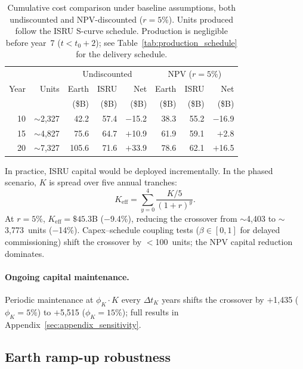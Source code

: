 \documentclass[preprint,12pt]{elsarticle}
\begin{document}
\begin{table}[htbp]
\centering
\caption{Cumulative cost comparison under baseline assumptions, both undiscounted and NPV-discounted ($r = 5\%$). Units produced follow the ISRU S-curve schedule. Production is negligible before year~7 ($t < t_0 + 2$); see Table~\ref{tab:production_schedule} for the delivery schedule.}
\label{tab:cumulative}
\begin{tabular}{@{}rr|rrr|rrr@{}}
\toprule
 & & \multicolumn{3}{c|}{Undiscounted} & \multicolumn{3}{c}{NPV ($r = 5\%$)} \\
Year & Units & Earth & ISRU & Net & Earth & ISRU & Net \\
 & & (\$B) & (\$B) & (\$B) & (\$B) & (\$B) & (\$B) \\
\midrule
10 & $\sim$2{,}327 & 42.2  & 57.4   & $-$15.2 & 38.3  & 55.2  & $-$16.9 \\
15 & $\sim$4{,}827 & 75.6  & 64.7   & $+$10.9 & 61.9  & 59.1  & $+$2.8  \\
20 & $\sim$7{,}327 & 105.6 & 71.6   & $+$33.9 & 78.6  & 62.1  & $+$16.5 \\
\bottomrule
\end{tabular}
\end{table}

In practice, ISRU capital would be deployed incrementally. In the phased scenario, $K$ is spread over five annual tranches:
\begin{equation}
  K_{\mathrm{eff}} = \sum_{y=0}^{4} \frac{K/5}{(1+r)^y}.
  \label{eq:phased_capital}
\end{equation}
At $r = 5\%$, $K_{\mathrm{eff}} = \$45.3$B ($-$9.4\%), reducing the crossover from $\sim$4{,}403 to $\sim$3{,}773~units ($-$14\%). Capex--schedule coupling tests ($\beta \in [0, 1]$ for delayed commissioning) shift the crossover by $<$100~units; the NPV capital reduction dominates.

\paragraph{Ongoing capital maintenance.} Periodic maintenance at $\phi_K \cdot K$ every $\Delta t_K$ years shifts the crossover by $+$1{,}435 ($\phi_K = 5\%$) to $+$5{,}515 ($\phi_K = 15\%$); full results in Appendix~\ref{sec:appendix_sensitivity}.

\subsection{Earth ramp-up robustness}
\label{sec:earth_ramp}
\end{document}
